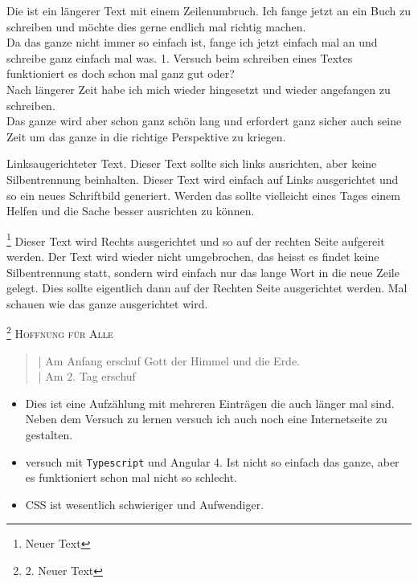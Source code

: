\documentclass[a4paper, 12pt]{scrartcl}
\begin{document}
	\begin{flushright}
	
	Die ist ein längerer Text mit einem Zeilenumbruch. Ich fange jetzt an ein Buch zu schreiben und möchte dies gerne endlich mal richtig machen. \\
	Da das ganze nicht immer so einfach ist, fange ich jetzt einfach mal an und schreibe ganz einfach mal was. 1. Versuch beim schreiben eines Textes funktioniert es doch schon mal ganz gut oder?\\[.5cm]
	Nach längerer Zeit habe ich mich wieder hingesetzt und wieder angefangen zu schreiben.\\
	Das ganze wird aber schon ganz schön lang und erfordert ganz sicher auch seine Zeit um das ganze in die richtige Perspektive zu kriegen.\\
	\begin{flushleft}
	Linksaugerichteter Text. Dieser Text sollte sich links ausrichten, aber keine Silbentrennung beinhalten. Dieser Text wird einfach auf Links ausgerichtet und so ein neues Schriftbild generiert. Werden das sollte vielleicht eines Tages einem Helfen und die Sache besser ausrichten zu können.
	\end{flushleft}
	\footnote{Neuer Text}
	Dieser Text wird Rechts ausgerichtet und so auf der rechten Seite aufgereit werden. Der Text wird wieder nicht umgebrochen, das heisst es findet keine Silbentrennung statt, sondern wird einfach nur das lange Wort in die neue Zeile gelegt. Dies sollte eigentlich dann auf der Rechten Seite ausgerichtet werden. Mal schauen wie das ganze ausgerichtet wird.
	\end{flushright}
	\footnote{2. Neuer Text}
	\textsc{Hoffnung für Alle}
	\begin{quote}
	| Am Anfang erschuf Gott der Himmel und die Erde. \\
	| Am 2. Tag erschuf
	\end{quote}
	\begin{itemize}
	\item Dies ist eine Aufzählung mit mehreren Einträgen die auch länger mal sind. Neben dem Versuch zu lernen versuch ich auch noch eine Internetseite zu gestalten. 
	\item versuch mit \texttt{Typescript} und Angular 4. Ist nicht so einfach das ganze, aber es funktioniert schon mal nicht so schlecht. 
	\item CSS ist wesentlich schwieriger und Aufwendiger.
	\end{itemize}
	
	
	
\end{document}
